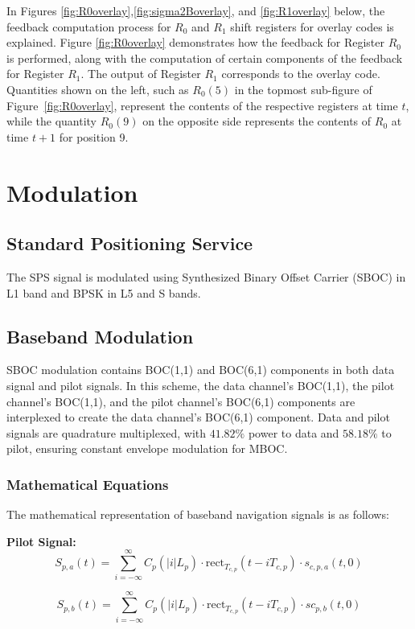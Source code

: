 In Figures \ref{fig:R0overlay},\ref{fig:sigma2Boverlay}, and \ref{fig:R1overlay} below, the feedback computation process for $R_0$ and $R_1$ shift registers for overlay codes is explained. Figure \ref{fig:R0overlay} demonstrates how the feedback for Register $R_0$ is performed, along with the computation of certain components of the feedback for Register $R_1$. The output of Register $R_1$ corresponds to the overlay code. Quantities shown on the left, such as $R_0(5)$ in the topmost sub-figure of Figure~\ref{fig:R0overlay}, represent the contents of the respective registers at time $t$, while the quantity $R_0(9)$ on the opposite side represents the contents of $R_0$ at time $t+1$ for position 9.
\newpage

\section{Modulation}

\subsection{Standard Positioning Service}
\noindent The SPS signal is modulated using Synthesized Binary Offset Carrier (SBOC) in L1 band and BPSK in L5 and  S bands.
\subsection{Baseband Modulation}
\noindent SBOC modulation contains  BOC(1,1) and BOC(6,1) components in both data signal  and pilot signals.  In this scheme, the data channel's BOC(1,1), the pilot channel's BOC(1,1), and the pilot channel's BOC(6,1) components are interplexed to create the data channel's BOC(6,1) component.  Data and pilot signals are quadrature multiplexed, with $41.82\%$ power to data and $58.18\%$ to pilot, ensuring constant envelope modulation for MBOC.
\subsubsection{Mathematical Equations}
\noindent The mathematical representation of baseband navigation signals is as follows:

\textbf{Pilot Signal:}
\begin{equation}
S_{p,a}(t) = \sum_{i=-\infty}^{\infty} C_p(|i|L_p) \cdot \text{rect}_{T_{c,p}} \left( t - iT_{c,p}\right) \cdot s_{c,p,a}(t, 0)
\label{eq:sp_a}
\end{equation}

\begin{equation}
S_{p,b}(t) = \sum_{i=-\infty}^{\infty} C_p(|i|L_p) \cdot \text{rect}_{T_{c,p}}  \left( {t - iT_{c,p}}\right) \cdot sc_{p,b}(t, 0)
\label{eq:sp_b}
\end{equation}

